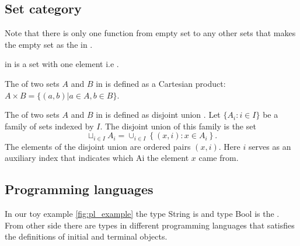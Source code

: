 \subsection{\textbf{Set} category}
\begin{example}
\label{ex:set_initial_object}
Note that there is only one function from empty set to any other sets
\cite{bib:proofwiki:Empty_Mapping_is_Unique} that makes the empty set
as the  in . 
\end{example}

\begin{example}
\label{ex:set_terminal_object}
 in  is a set
with one element i.e . 
\end{example}

\begin{example}
\label{ex:set_product}
The  of two sets $A$ and $B$ in
 is defined 
as a Cartesian product: $A \times B = \{(a,b)| a \in A, b \in B\}$. 
\end{example}

\begin{example}
  \label{ex:set_sum}
  The  of two sets $A$ and $B$ in
   is defined as disjoint union
  \cite{wiki:disjointunion}. Let $\{A_i: i \in I\}$ be a family of sets 
  indexed by $I$. The 
  disjoint union of this family is the set
  \[
  \sqcup_{i \in I} A_i = \cup_{i \in I}\left\{
  \left(x, i\right): x \in A_i
  \right\}.
  \]
  The elements of the disjoint union are ordered pairs $(x, i)$. Here $i$
  serves as an auxiliary index that indicates which Ai the element $x$
  came from.
\end{example}

\subsection{Programming languages}
In our toy example \cref{fig:pl_example} the type String is
 and type Bool is the
. From other side there are types in
different programming languages that satisfies the definitions of
initial and terminal objects.

